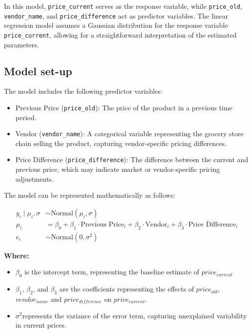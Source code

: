\documentclass[
  letterpaper,
  DIV=11,
  numbers=noendperiod]{scrartcl}
\begin{document}
In this model, \texttt{price\_current} serves as the response variable,
while \texttt{price\_old}, \texttt{vendor\_name}, and
\texttt{price\_difference} act as predictor variables. The linear
regression model assumes a Gaussian distribution for the response
variable \texttt{price\_current}, allowing for a straightforward
interpretation of the estimated parameters.

\subsection{Model set-up}\label{model-set-up}

The model includes the following predictor variables:

\begin{itemize}
\item
  Previous Price (\texttt{price\_old}): The price of the product in a
  previous time period.
\item
  Vendor (\texttt{vendor\_name}): A categorical variable representing
  the grocery store chain selling the product, capturing vendor-specific
  pricing differences.
\item
  Price Difference (\texttt{price\_difference}): The difference between
  the current and previous price, which may indicate market or
  vendor-specific pricing adjustments.
\end{itemize}

The model can be represented mathematically as follows:

\begin{align*}
    y_i \mid \mu_i, \sigma &\sim \text{Normal}(\mu_i, \sigma) \\
    \mu_i &= \beta_0 + \beta_1 \cdot \text{Previous Price}_i + \beta_2 \cdot \text{Vendor}_i + \beta_3 \cdot \text{Price Difference}_i \\
    \epsilon_i &\sim \text{Normal}(0, \sigma^2)
\end{align*}

\textbf{Where:}

\begin{itemize}
    \item $\beta_0$ is the intercept term, representing the baseline estimate of $price_{current}$
    \item $\beta_1$, $\beta_2$, and $\beta_3$ are the coefficients representing the effects of $price_{old}$, $vendor_{name}$ and $price_{difference}$ on $price_{current}$.
    \item $\sigma^2$represents the variance of the error term, capturing unexplained variability in current prices.
\end{itemize}
\end{document}
